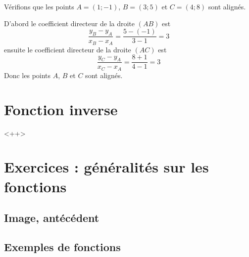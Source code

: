 \begin{example}
    Vérifions que les points \( A=(1;-1)\), \( B=(3;5)\) et \( C=(4;8)\) sont alignés.

    D'abord le coefficient directeur de la droite \( (AB)\) est 
    \begin{equation}
        \frac{ y_B-y_A }{ x_B-x_A }=\frac{ 5-(-1) }{ 3-1 }=3
    \end{equation}
    ensuite le coefficient directeur de la droite \( (AC)\) est
    \begin{equation}
        \frac{ y_C-y_A }{ x_C-x_A }=\frac{ 8+1 }{ 4-1 }=3
    \end{equation}
    Donc les points \( A\), \( B\) et \( C\) sont alignés.
\end{example}


\section{Fonction inverse}

<++>

\section{Exercices : généralités sur les fonctions}

\subsection{Image, antécédent}


\subsection{Exemples de fonctions}

